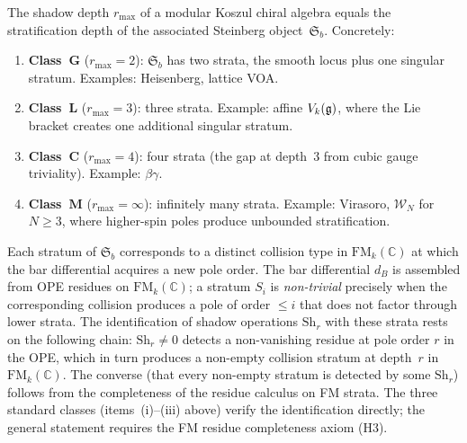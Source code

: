 \begin{proposition}[Shadow depth = stratification depth]
\ClaimStatusConjectured
The shadow depth $r_{\max}$ of a modular Koszul chiral
algebra equals the stratification depth of the associated
Steinberg object~$\mathfrak{S}_b$. Concretely:
\begin{enumerate}[label=\textup{(\roman*)}]
\item \textbf{Class~$\mathbf{G}$}
 ($r_{\max} = 2$): $\mathfrak{S}_b$ has two strata,
 the smooth locus plus one singular stratum.
 Examples: Heisenberg, lattice VOA.
\item \textbf{Class~$\mathbf{L}$}
 ($r_{\max} = 3$): three strata.
 Example: affine $V_k(\mathfrak{g})$, where the Lie bracket
 creates one additional singular stratum.
\item \textbf{Class~$\mathbf{C}$}
 ($r_{\max} = 4$): four strata
 (the gap at depth~$3$ from cubic gauge triviality).
 Example: $\beta\gamma$.
\item \textbf{Class~$\mathbf{M}$}
 ($r_{\max} = \infty$): infinitely many strata.
 Example: Virasoro, $\mathcal{W}_N$ for $N \geq 3$, where
 higher-spin poles produce unbounded stratification.
\end{enumerate}
\end{proposition}

\begin{remark}[Evidence]
Each stratum of $\mathfrak{S}_b$ corresponds to a distinct
collision type in $\mathrm{FM}_k(\mathbb{C})$ at which the
bar differential acquires a new pole order. The bar
differential $d_B$ is assembled from OPE residues on
$\mathrm{FM}_k(\mathbb{C})$; a stratum $S_i$ is
\emph{non-trivial} precisely when the corresponding
collision produces a pole of order $\leq i$ that does not
factor through lower strata. The identification of shadow
operations $\mathrm{Sh}_r$ with these strata rests on
the following chain: $\mathrm{Sh}_r \neq 0$ detects a
non-vanishing residue at pole order $r$ in the OPE, which
in turn produces a non-empty collision stratum at depth~$r$
in $\mathrm{FM}_k(\mathbb{C})$. The converse (that every
non-empty stratum is detected by some $\mathrm{Sh}_r$)
follows from the completeness of the residue calculus on FM
strata. The three standard classes
(items~(i)--(iii) above) verify the identification directly; the
general statement requires the FM residue completeness axiom (H3).
\end{remark}

